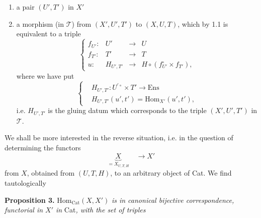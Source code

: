 \documentclass[11pt]{article}
\newcommand{\msp}[1]{\marginpar{\footnotesize [#1]}}
\begin{document}
\begin{enumerate}[label={}]
\item[$1^\circ$)] a pair $(U',T')$ in $X'$
\item[$2^\circ$)] a morphism (in $\mathcal{T}$) from $(X',U',T')$ to $(X,U,T)$, which by 1.1 is equivalent to a triple
\[
\left\{\begin{array}{rccl}
f_{U'} : & U' & \longrightarrow & U\\[1ex]
f_{T'} : & T' & \longrightarrow & T\\[1ex]
u : & H_{U',T'} & \longrightarrow & H \circ (f_{U'}^\circ \times f_{T'}),
\end{array}\right.
\]
where we have put
\[
\left\{\begin{aligned}
&H_{U',T'} : U^{\prime\circ} \times T' \longrightarrow \mathrm{Ens}\\[1ex]
&H_{U',T'}(u',t') = \mathrm{Hom}_{X'}(u',t'),
\end{aligned}\right.
\]
i.e. $H_{U',T'}$ is the gluing datum which corresponds to the triple $(X',U',T')$ in $\mathcal{T}$. %
\end{enumerate}

\msp{page 66}

We shall be more interested in the reverse situation, i.e. in the question of determining the functors
\[
\underbrace{X}_{= X_{U,T,H}} \quad \longrightarrow X'
\]
from $X$, obtained from $(U,T,H)$, to an arbitrary object of Cat. We find tautologically

\textbf{Proposition 3.} $\mathrm{Hom}_{\mathrm{Cat}}(X,X')$ \textit{is in canonical bijective correspondence, functorial in $X'$ in} Cat\textit{, with the set of triples}
\end{document}
